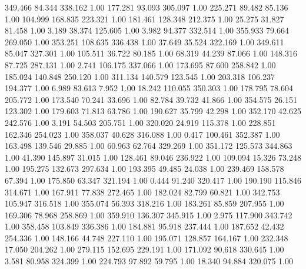  349.466   84.344  338.162         1.00
 177.281   93.093  305.097         1.00
 225.271   89.482   85.136         1.00
 104.999  168.835  223.321         1.00
 181.461  128.348  212.375         1.00
  25.275   31.827   81.458         1.00
   3.189   38.374  125.605         1.00
   3.982   94.377  332.514         1.00
 355.933   79.664  269.050         1.00
 353.251  108.635  336.438         1.00
  37.649   35.524  322.169         1.00
 349.611   85.047  327.301         1.00
 105.511   36.722   80.185         1.00
  68.319   44.239   87.066         1.00
 148.316   87.725  287.131         1.00
   2.741  106.175  337.066         1.00
 173.695   87.600  258.842         1.00
 185.024  140.848  250.120         1.00
 311.134  140.579  123.545         1.00
 203.318  106.237  194.377         1.00
   6.989   83.613    7.952         1.00
  18.242  110.055  350.303         1.00
 178.795   78.604  205.772         1.00
 173.540   70.241   33.696         1.00
  82.784   39.732   41.866         1.00
 354.575   26.151  123.302         1.00
 179.603   71.813   63.786         1.00
 190.627   35.799   42.298         1.00
 352.170   42.625  242.576         1.00
   3.191   54.503  205.751         1.00
 320.020   24.919  115.378         1.00
 228.851  162.346  254.023         1.00
 358.037   40.628  316.088         1.00
   0.417  100.461  352.387         1.00
 163.498  139.546   29.885         1.00
  60.963   62.764  329.269         1.00
 351.172  125.573  344.863         1.00
  41.390  145.897   31.015         1.00
 128.461   89.046  236.922         1.00
 109.094   15.326   73.248         1.00
 195.275  132.673  297.634         1.00
 193.395   49.485   24.038         1.00
 239.469  158.578   67.394         1.00
 175.850   63.347  321.194         1.00
   0.444   91.240  320.417         1.00
 190.190  115.846  314.671         1.00
 167.911   77.838  272.465         1.00
 182.024   82.799   60.821         1.00
 342.753  105.947  316.518         1.00
 355.074   56.393  318.216         1.00
 183.261   85.859  207.955         1.00
 169.306   78.968  258.869         1.00
 359.910  136.307  345.915         1.00
   2.975  117.900  343.742         1.00
 358.458  103.849  336.386         1.00
 184.881   95.918  237.444         1.00
 187.652   42.432  254.336         1.00
 148.166   44.748  227.110         1.00
 195.071  128.857  164.167         1.00
 232.348   17.050  204.262         1.00
 279.115  152.695  229.191         1.00
 171.092   90.618  330.645         1.00
   3.581   80.958  324.399         1.00
 224.793   97.892   59.795         1.00
  18.340   94.884  320.075         1.00
